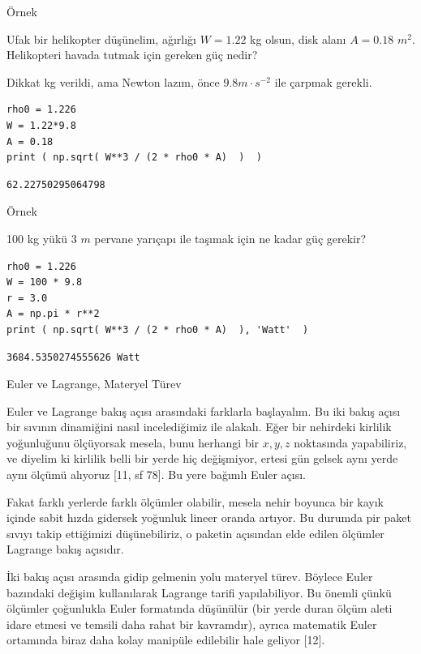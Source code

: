 \documentclass[12pt,fleqn]{article}\usepackage{../../common}
\begin{document}
Örnek

Ufak bir helikopter düşünelim, ağırlığı $W = 1.22$ kg olsun, disk alanı
$A = 0.18$ $m^2$. Helikopteri havada tutmak için gereken güç nedir?

Dikkat kg verildi, ama Newton lazım, önce $9.8 m \cdot s^{-2}$ ile çarpmak gerekli.

\begin{verbatim}
rho0 = 1.226
W = 1.22*9.8
A = 0.18
print ( np.sqrt( W**3 / (2 * rho0 * A)  )  )  
\end{verbatim}

\begin{verbatim}
62.22750295064798
\end{verbatim}

Örnek

100 kg yükü 3 $m$ pervane yarıçapı ile taşımak için ne kadar güç gerekir?

\begin{verbatim}
rho0 = 1.226
W = 100 * 9.8
r = 3.0
A = np.pi * r**2
print ( np.sqrt( W**3 / (2 * rho0 * A)  ), 'Watt'  ) 
\end{verbatim}

\begin{verbatim}
3684.5350274555626 Watt
\end{verbatim}

Euler ve Lagrange, Materyel Türev

Euler ve Lagrange bakış açısı arasındaki farklarla başlayalım. Bu iki bakış
açısı bir sıvının dinamiğini nasıl incelediğimiz ile alakalı. Eğer bir nehirdeki
kirlilik yoğunluğunu ölçüyorsak mesela, bunu herhangi bir $x,y,z$ noktasında
yapabiliriz, ve diyelim ki kirlilik belli bir yerde hiç değişmiyor, ertesi gün
gelsek aynı yerde aynı ölçümü alıyoruz [11, sf 78]. Bu yere bağımlı Euler açısı.

Fakat farklı yerlerde farklı ölçümler olabilir, mesela nehir boyunca bir kayık
içinde sabit hızda gidersek yoğunluk lineer oranda artıyor. Bu durumda pir paket
sıvıyı takip ettiğimizi düşünebiliriz, o paketin açısından elde edilen ölçümler
Lagrange bakış açısıdır. 

İki bakış açısı arasında gidip gelmenin yolu materyel türev. Böylece Euler
bazındaki değişim kullanılarak Lagrange tarifi yapılabiliyor. Bu önemli çünkü
ölçümler çoğunlukla Euler formatında düşünülür (bir yerde duran ölçüm aleti
idare etmesi ve temsili daha rahat bir kavramdır), ayrıca matematik Euler
ortamında biraz daha kolay manipüle edilebilir hale geliyor [12].
\end{document}
